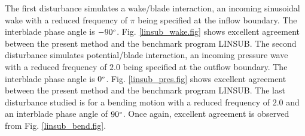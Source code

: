  The first disturbance simulates a wake/blade interaction, an incoming
 sinusoidal wake with a reduced frequency of $\pi$ being specified at the inflow boundary.
 The  interblade phase angle is $-90^{\mbox{\tiny $o$}}$. Fig. \ref{linsub_wake.fig}
 shows  excellent agreement between the present method and the benchmark program LINSUB.
 The second disturbance simulates potential/blade interaction,  an
 incoming pressure wave with a reduced frequency of $2.0$ being specified
 at the outflow boundary. The interblade phase angle is $0^{\mbox{\tiny $o$}}$.
 Fig. \ref{linsub_pres.fig} shows excellent agreement between the present method and the
 benchmark program LINSUB.
 The last disturbance  studied is for a bending motion with a reduced frequency of
 $2.0$ and an interblade phase angle of $90^{\mbox{\tiny $o$}}$. Once again, excellent agreement
 is observed from Fig. \ref{linsub_bend.fig}.
%
